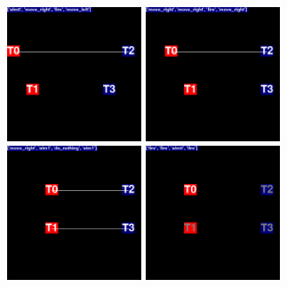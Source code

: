 \documentclass{beamer}
\begin{document}
\begin{frame}
    \begin{figure}
    \centering
    \begin{minipage}{.5\textwidth}
      \centering
      \includegraphics[width=4cm]{images/animation01/screenshot0-1.png}
    \end{minipage}%
    \begin{minipage}{.5\textwidth}
      \centering
      \includegraphics[width=4cm]{images/animation01/screenshot0-2.png}
    \end{minipage}
    \centering
    \begin{minipage}{.5\textwidth}
      \centering
      \includegraphics[width=4cm]{images/animation01/screenshot0-3.png}
    \end{minipage}%
    \begin{minipage}{.5\textwidth}
      \centering
      \includegraphics[width=4cm]{images/animation01/screenshot0-4.png}
    \end{minipage}
    \label{fig:simple_tactic01}
    \end{figure}
\end{frame}
\end{document}
